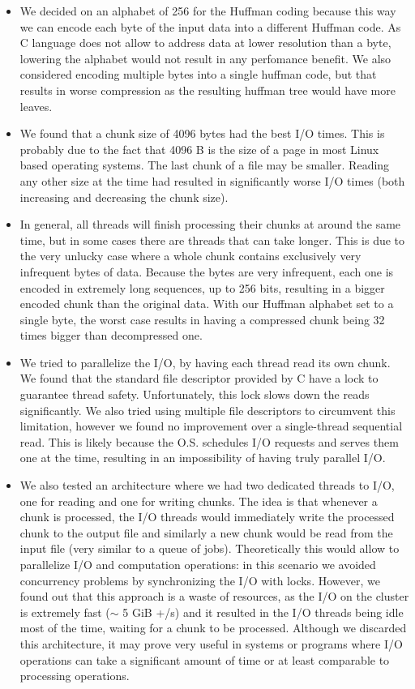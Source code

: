 \begin{itemize}
\item We decided on an alphabet of 256 for the Huffman coding because this way we can encode each byte of the input data into a different Huffman code. As C language does not allow to address data at lower resolution than a byte, lowering the alphabet would not result in any perfomance benefit. We also considered encoding multiple bytes into a single huffman code, but that results in worse compression as the resulting huffman tree would have more leaves.

\item We found that a chunk size of 4096 bytes had the best I/O times. This is probably due to the fact that 4096 B is the size of a page in most Linux based operating systems. The last chunk of a file may be smaller. Reading any other size at the time had resulted in significantly worse I/O times (both increasing and decreasing the chunk size).

\item In general, all threads will finish processing their chunks at around the same time, but in some cases there are threads that can take longer. This is due to the very unlucky case where a whole chunk contains exclusively very infrequent bytes of data. Because the bytes are very infrequent, each one is encoded in extremely long sequences, up to 256 bits, resulting in a bigger encoded chunk than the original data. With our Huffman alphabet set to a single byte, the worst case results in having a compressed chunk being 32 times bigger than decompressed one.

\item We tried to parallelize the I/O, by having each thread read its own chunk. We found that the standard file descriptor provided by C have a lock to guarantee thread safety. Unfortunately, this lock slows down the reads significantly. We also tried using multiple file descriptors to circumvent this limitation, however we found no improvement over a single-thread sequential read. This is likely because the O.S. schedules I/O requests and serves them one at the time, resulting in an impossibility of having truly parallel I/O.

\item We also tested an architecture where we had two dedicated threads to I/O, one for reading and one for writing chunks. The idea is that whenever a chunk is processed, the I/O threads would immediately write the processed chunk to the output file and similarly a new chunk would be read from the input file (very similar to a queue of jobs). Theoretically this would allow to parallelize I/O and computation operations: in this scenario we avoided concurrency problems by synchronizing the I/O with locks. However, we found out that this approach is a waste of resources, as the I/O on the cluster is extremely fast ($\sim$ 5 GiB +/s) and it resulted in the I/O threads being idle most of the time, waiting for a chunk to be processed. Although we discarded this architecture, it may prove very useful in systems or programs where I/O operations can take a significant amount of time or at least comparable to processing operations.


\end{itemize}

